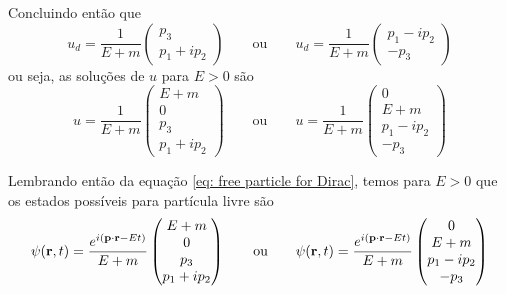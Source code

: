     Concluindo então que
        \begin{equation*}
            u_{d} = \dfrac{1}{E+m}\begin{pmatrix}
                {p}_{3} \\
                {p}_{1} + i{p}_{2}
            \end{pmatrix} \qquad \text{ou} \qquad 
            u_{d} = \dfrac{1}{E+m}\begin{pmatrix}
                {p}_{1} - i{p}_{2} \\
                -{p}_{3}
            \end{pmatrix}
        \end{equation*}
    ou seja, as soluções de $u$ para $E > 0$ são
        \begin{equation*}
            u = \dfrac{1}{E+m}\begin{pmatrix}
                E+m \\ 0 \\ p_{3} \\ p_{1} + ip_{2}
            \end{pmatrix} \qquad \text{ou} \qquad 
            u = \dfrac{1}{E+m}\begin{pmatrix}
                0 \\ E+m \\ p_{1} - ip_{2} \\ -p_{3}
            \end{pmatrix}
        \end{equation*}

    Lembrando então da equação \eqref{eq: free particle for Dirac}, temos para $E > 0$ que os estados possíveis para partícula livre são
        \begin{equation*}
            \psi(\vb{r},t) = \dfrac{e^{i(\vb{p}\cdot\vb{r} - Et)}}{E+m}\begin{pmatrix}
                E+m \\ 0 \\ p_{3} \\ p_{1} + ip_{2}
            \end{pmatrix} \qquad \text{ou} \qquad 
            \psi(\vb{r},t) = \dfrac{e^{i(\vb{p}\cdot\vb{r} - Et)}}{E+m}\begin{pmatrix}
                0 \\ E+m \\ p_{1} - ip_{2} \\ -p_{3}
            \end{pmatrix}
        \end{equation*}

